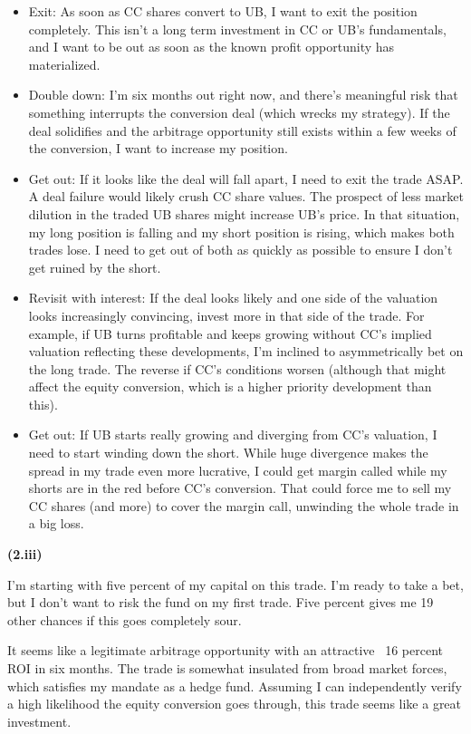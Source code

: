 \documentclass[11pt]{article}
\begin{document}
\begin{itemize}
  \item Exit: As soon as CC shares convert to UB, I want to exit the position completely. This isn't a long term investment in CC or UB's fundamentals, and I want to be out as soon as the known profit opportunity has materialized. 
  \item Double down: I'm six months out right now, and there's meaningful risk that something interrupts the conversion deal (which wrecks my strategy). If the deal solidifies and the arbitrage opportunity still exists within a few weeks of the conversion, I want to increase my position.
  \item Get out: If it looks like the deal will fall apart, I need to exit the trade ASAP. A deal failure would likely crush CC share values. The prospect of less market dilution in the traded UB shares might increase UB's price. In that situation, my long position is falling and my short position is rising, which makes both trades lose. I need to get out of both as quickly as possible to ensure I don't get ruined by the short.
  \item Revisit with interest: If the deal looks likely and one side of the valuation looks increasingly convincing, invest more in that side of the trade. For example, if UB turns profitable and keeps growing without CC's implied valuation reflecting these developments, I'm inclined to asymmetrically bet on the long trade. The reverse if CC's conditions worsen (although that might affect the equity conversion, which is a higher priority development than this).
  \item Get out: If UB starts really growing and diverging from CC's valuation, I need to start winding down the short. While huge divergence makes the spread in my trade even more lucrative, I could get margin called while my shorts are in the red before CC's conversion. That could force me to sell my CC shares (and more) to cover the margin call, unwinding the whole trade in a big loss.
\end{itemize}

\newpage

\textbf{(2.iii)}

I'm starting with five percent of my capital on this trade. I'm ready to take a bet, but I don't want to risk the fund on my first trade. Five percent gives me 19 other chances if this goes completely sour.

It seems like a legitimate arbitrage opportunity with an attractive ~16 percent ROI in six months. The trade is somewhat insulated from broad market forces, which satisfies my mandate as a hedge fund. Assuming I can independently verify a high likelihood the equity conversion goes through, this trade seems like a great investment.
\end{document}
